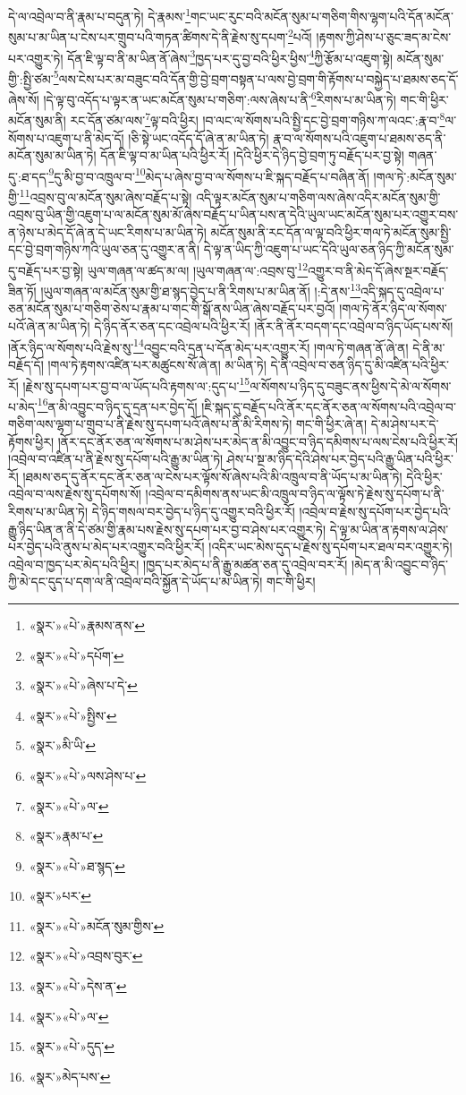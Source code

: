 དེ་ལ་འབྲེལ་བ་ནི་རྣམ་པ་བདུན་ཏེ། དེ་རྣམས་\footnote{«སྣར་»«པེ་»རྣམས་ནས་}གང་ཡང་རུང་བའི་མངོན་སུམ་པ་གཅིག་གིས་ལྷག་པའི་དོན་མངོན་སུམ་པ་མ་ཡིན་པ་ངེས་པར་གྲུབ་པའི་གཏན་ཚིགས་དེ་ནི་རྗེས་སུ་དཔག་\footnote{«སྣར་»«པེ་»དཔོག་}པའོ། །རྟགས་ཀྱི་ཤེས་པ་ཅུང་ཟད་མ་ངེས་པར་འགྱུར་ཏེ། དོན་ཇི་ལྟ་བ་ནི་མ་ཡིན་ནོ་ཞེས་\footnote{«སྣར་»«པེ་»ཞེས་པ་དེ་}ཁྱད་པར་དུ་བྱ་བའི་ཕྱིར་ཕྱིས་\footnote{«སྣར་»«པེ་»སྤྱིས་}ཀྱི་རྩོམ་པ་འཇུག་སྟེ། མངོན་སུམ་གྱི་:སྤྱི་ཙམ་\footnote{«སྣར་»མི་ཡི་}ལས་ངེས་པར་མ་བཟུང་བའི་དོན་གྱི་བྱེ་བྲག་བསྟན་པ་ལས་བྱེ་བྲག་གི་རྟོགས་པ་བསྐྱེད་པ་ཐམས་ཅད་དོ་ཞེས་སོ། །དེ་ལྟ་བུ་འདོད་པ་ལྟར་ན་ཡང་མངོན་སུམ་པ་གཅིག་:ལས་ཞེས་པ་ནི་\footnote{«སྣར་»«པེ་»ལས་ཤེས་པ་}རིགས་པ་མ་ཡིན་ཏེ། གང་གི་ཕྱིར་མངོན་སུམ་ནི། རང་དོན་ཙམ་ལས་\footnote{«སྣར་»«པེ་»ལ་}ལྟ་བའི་ཕྱིར། །བ་ལང་ལ་སོགས་པའི་སྤྱི་དང་བྱེ་བྲག་གཉིས་ཀ་ལའང་:རྣ་བ་\footnote{«སྣར་»རྣམ་པ་}ལ་སོགས་པ་འཇུག་པ་ནི་མེད་དོ། །ཅི་སྟེ་ཡང་འདོད་དོ་ཞེ་ན་མ་ཡིན་ཏེ། རྣ་བ་ལ་སོགས་པའི་འཇུག་པ་ཐམས་ཅད་ནི་མངོན་སུམ་མ་ཡིན་ཏེ། དོན་ཇི་ལྟ་བ་མ་ཡིན་པའི་ཕྱིར་རོ། །དེའི་ཕྱིར་དེ་ཉིད་བྱེ་བྲག་ཏུ་བརྗོད་པར་བྱ་སྟེ། གཞན་དུ་:ཐ་དད་\footnote{«སྣར་»«པེ་»ཐ་སྙད་}དུ་མི་བྱ་བ་འཁྲུལ་བ་\footnote{«སྣར་»པར་}མེད་པ་ཞེས་བྱ་བ་ལ་སོགས་པ་ཇི་སྐད་བརྗོད་པ་བཞིན་ནོ། །གལ་ཏེ་:མངོན་སུམ་གྱི་\footnote{«སྣར་»«པེ་»མངོན་སུམ་གྱིས་}འབྲས་བུ་ལ་མངོན་སུམ་ཞེས་བརྗོད་པ་སྟེ། འདི་ལྟར་མངོན་སུམ་པ་གཅིག་ལས་ཞེས་འདིར་མངོན་སུམ་གྱི་འབྲས་བུ་ཡིན་གྱི་འཇུག་པ་ལ་མངོན་སུམ་མོ་ཞེས་བརྗོད་པ་ཡིན་པས་ན་དེའི་ཡུལ་ཡང་མངོན་སུམ་པར་འགྱུར་བས་ན་ཉེས་པ་མེད་དོ་ཞེ་ན་དེ་ཡང་རིགས་པ་མ་ཡིན་ཏེ། མངོན་སུམ་ནི་རང་དོན་ལ་ལྟ་བའི་ཕྱིར་གལ་ཏེ་མངོན་སུམ་སྤྱི་དང་བྱེ་བྲག་གཉིས་ཀའི་ཡུལ་ཅན་དུ་འགྱུར་ན་ནི། དེ་ལྟ་ན་ཡིད་ཀྱི་འཇུག་པ་ཡང་དེའི་ཡུལ་ཅན་ཉིད་ཀྱི་མངོན་སུམ་དུ་བརྗོད་པར་བྱ་སྟེ། ཡུལ་གཞན་ལ་ཚད་མ་ལ། །ཡུལ་གཞན་ལ་:འབྲས་བུ་\footnote{«སྣར་»«པེ་»འབྲས་བུར་}འགྱུར་བ་ནི་མེད་དོ་ཞེས་སྔར་བརྗོད་ཟིན་ཏོ། །ཡུལ་གཞན་ལ་མངོན་སུམ་གྱི་ཐ་སྙད་བྱེད་པ་ནི་རིགས་པ་མ་ཡིན་ནོ། །:དེ་ནས་\footnote{«སྣར་»«པེ་»དེས་ན་}འདི་སྐད་དུ་འབྲེལ་པ་ཅན་མངོན་སུམ་པ་གཅིག་ཅེས་པ་རྣམ་པ་གང་གི་སྒོ་ནས་ཡིན་ཞེས་བརྗོད་པར་བྱའོ། །གལ་ཏེ་ནོར་ཉིད་ལ་སོགས་པའོ་ཞེ་ན་མ་ཡིན་ཏེ། དེ་ཉིད་ནོར་ཅན་དང་འབྲེལ་པའི་ཕྱིར་རོ། །ནོར་ནི་ནོར་བདག་དང་འབྲེལ་བ་ཉིད་ཡོད་པས་སོ། །ནོར་ཉིད་ལ་སོགས་པའི་རྗེས་སུ་\footnote{«སྣར་»«པེ་»ལ་}འབྱུང་བའི་དྲན་པ་དོན་མེད་པར་འགྱུར་རོ། །གལ་ཏེ་གཞན་ནོ་ཞེ་ན། དེ་ནི་མ་བརྗོད་དོ། །གལ་ཏེ་རྟགས་འཛིན་པར་མཚུངས་སོ་ཞེ་ན། མ་ཡིན་ཏེ། དེ་ནི་འབྲེལ་བ་ཅན་ཉིད་དུ་མི་འཛིན་པའི་ཕྱིར་རོ། །རྗེས་སུ་དཔག་པར་བྱ་བ་ལ་ཡོད་པའི་རྟགས་ལ་:དུད་པ་\footnote{«སྣར་»«པེ་»དུད་}ལ་སོགས་པ་ཉིད་དུ་བཟུང་ནས་ཕྱིས་དེ་མེ་ལ་སོགས་པ་མེད་\footnote{«སྣར་»མེད་པས་}ན་མི་འབྱུང་བ་ཉིད་དུ་དྲན་པར་བྱེད་དོ། །ཇི་སྐད་དུ་བརྗོད་པའི་ནོར་དང་ནོར་ཅན་ལ་སོགས་པའི་འབྲེལ་བ་གཅིག་ལས་ལྷག་པ་གྲུབ་པ་ནི་རྗེས་སུ་དཔག་པའོ་ཞེས་པ་ནི་མི་རིགས་ཏེ། གང་གི་ཕྱིར་ཞེ་ན། དེ་མ་ཤེས་པར་དེ་རྟོགས་ཕྱིར། །ནོར་དང་ནོར་ཅན་ལ་སོགས་པ་མ་ཤེས་པར་མེད་ན་མི་འབྱུང་བ་ཉིད་དམིགས་པ་ལས་ངེས་པའི་ཕྱིར་རོ། །འབྲེལ་བ་འཛིན་པ་ནི་རྗེས་སུ་དཔོག་པའི་རྒྱུ་མ་ཡིན་ཏེ། ཤེས་པ་སྔ་མ་ཉིད་དེའི་ཤེས་པར་བྱེད་པའི་རྒྱུ་ཡིན་པའི་ཕྱིར་རོ། །ཐམས་ཅད་དུ་ནོར་དང་ནོར་ཅན་ལ་ངེས་པར་ལྟོས་སོ་ཞེས་པའི་མི་འཁྲུལ་བ་ནི་ཡོད་པ་མ་ཡིན་ཏེ། དེའི་ཕྱིར་འབྲེལ་བ་ལས་རྗེས་སུ་དཔོགས་སོ། །འབྲེལ་བ་དམིགས་ནས་ཡང་མི་འཁྲུལ་བ་ཉིད་ལ་ལྟོས་ཏེ་རྗེས་སུ་དཔོག་པ་ནི་རིགས་པ་མ་ཡིན་ཏེ། དེ་ཉིད་གསལ་བར་བྱེད་པ་ཉིད་དུ་འགྱུར་བའི་ཕྱིར་རོ། །འབྲེལ་བ་རྗེས་སུ་དཔོག་པར་བྱེད་པའི་རྒྱུ་ཉིད་ཡིན་ན་ནི་དེ་ཙམ་གྱི་རྣམ་པས་རྗེས་སུ་དཔག་པར་བྱ་བ་ཤེས་པར་འགྱུར་ཏེ། དེ་ལྟ་མ་ཡིན་ན་རྟགས་ལ་ཤེས་པར་བྱེད་པའི་ནུས་པ་མེད་པར་འགྱུར་བའི་ཕྱིར་རོ། །འདིར་ཡང་མེས་དུད་པ་རྗེས་སུ་དཔོག་པར་ཐལ་བར་འགྱུར་ཏེ། འབྲེལ་བ་ཁྱད་པར་མེད་པའི་ཕྱིར། །ཁྱད་པར་མེད་པ་ནི་རྒྱུ་མཚན་ཅན་དུ་འབྲེལ་བར་རོ། །མེད་ན་མི་འབྱུང་བ་ཉིད་ཀྱི་མེ་དང་དུད་པ་དག་ལ་ནི་འབྲེལ་བའི་སྐྱོན་དེ་ཡོད་པ་མ་ཡིན་ཏེ། གང་གི་ཕྱིར། 